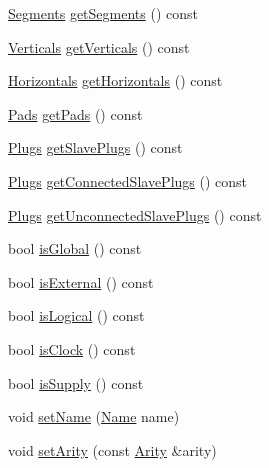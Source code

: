 \begin{DoxyCompactItemize}
\item 
\hyperlink{namespaceHurricane_a30748fa53a81cb597d4a13d651238716}{Segments} \hyperlink{classHurricane_1_1Net_aadc5a9ef26d7a72f49fdf22452f3cc58}{get\+Segments} () const
\item 
\hyperlink{namespaceHurricane_a146e2d3d34b4035aff422f12e85345b9}{Verticals} \hyperlink{classHurricane_1_1Net_a97f32cf738af9cf107833ca81fe95db8}{get\+Verticals} () const
\item 
\hyperlink{namespaceHurricane_a721e644c7d97f2f66049ab062140b855}{Horizontals} \hyperlink{classHurricane_1_1Net_ad8553af888909e1c127e12e68bd000fb}{get\+Horizontals} () const
\item 
\hyperlink{namespaceHurricane_abd1f433c44d8b515e1b8a8810aea1610}{Pads} \hyperlink{classHurricane_1_1Net_a564df07be5589bc72dd6eb944855aa2b}{get\+Pads} () const
\item 
\hyperlink{namespaceHurricane_ac8335d2057483ee7a935c15a9460c64f}{Plugs} \hyperlink{classHurricane_1_1Net_a9c835d2f071155521700921d816ac1fa}{get\+Slave\+Plugs} () const
\item 
\hyperlink{namespaceHurricane_ac8335d2057483ee7a935c15a9460c64f}{Plugs} \hyperlink{classHurricane_1_1Net_a08560ffa6b0f5ecc442bf232486dd8ff}{get\+Connected\+Slave\+Plugs} () const
\item 
\hyperlink{namespaceHurricane_ac8335d2057483ee7a935c15a9460c64f}{Plugs} \hyperlink{classHurricane_1_1Net_aad3f3ea88bdea914cab3f38bdcdb843d}{get\+Unconnected\+Slave\+Plugs} () const
\item 
bool \hyperlink{classHurricane_1_1Net_a332e9b311809f75fc0fa3a5f36acebcc}{is\+Global} () const
\item 
bool \hyperlink{classHurricane_1_1Net_aeeb3735dd7451bc0054dd68ac21aae47}{is\+External} () const
\item 
bool \hyperlink{classHurricane_1_1Net_a9caf25bfa84478157d206979dd521ed4}{is\+Logical} () const
\item 
bool \hyperlink{classHurricane_1_1Net_a8807cc000bbbe1c340c71fcbfbb8fe33}{is\+Clock} () const
\item 
bool \hyperlink{classHurricane_1_1Net_ab8947fc6c5093341958b94148407c2a2}{is\+Supply} () const
\item 
void \hyperlink{classHurricane_1_1Net_a1a39702b9f4d26ba29ad0dafcdddf840}{set\+Name} (\hyperlink{classHurricane_1_1Name}{Name} name)
\item 
void \hyperlink{classHurricane_1_1Net_af5dfdca4401902ee7e1e46a1a486da38}{set\+Arity} (const \hyperlink{classHurricane_1_1Net_a3a242d929e0c733f90f3f69be8cc427b}{Arity} \&arity)

\end{DoxyCompactItemize}
